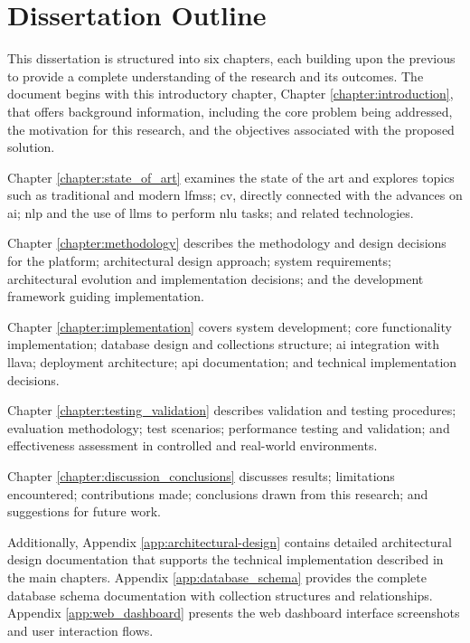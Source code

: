 \section{Dissertation Outline} \label{section:dissertation_outline}

This dissertation is structured into six chapters, each building upon the previous to provide a complete understanding of the research and its outcomes. The document begins with this introductory chapter, Chapter \ref{chapter:introduction}, that offers background information, including the core problem being addressed, the motivation for this research, and the objectives associated with the proposed solution.

Chapter \ref{chapter:state_of_art} examines the state of the art and explores topics such as traditional and modern \acp{lfms}; \ac{cv}, directly connected with the advances on \ac{ai}; \ac{nlp} and the use of \acp{llm} to perform \ac{nlu} tasks; and related technologies.

Chapter \ref{chapter:methodology} describes the methodology and design decisions for the platform; architectural design approach; system requirements; architectural evolution and implementation decisions; and the development framework guiding implementation.

Chapter \ref{chapter:implementation} covers system development; core functionality implementation; database design and collections structure; \ac{ai} integration with \ac{llava}; deployment architecture; \ac{api} documentation; and technical implementation decisions.

Chapter \ref{chapter:testing_validation} describes validation and testing procedures; evaluation methodology; test scenarios; performance testing and validation; and effectiveness assessment in controlled and real-world environments.

Chapter \ref{chapter:discussion_conclusions} discusses results; limitations encountered; contributions made; conclusions drawn from this research; and suggestions for future work.

Additionally, Appendix \ref{app:architectural-design} contains detailed architectural design documentation that supports the technical implementation described in the main chapters. Appendix \ref{app:database_schema} provides the complete database schema documentation with collection structures and relationships. Appendix \ref{app:web_dashboard} presents the web dashboard interface screenshots and user interaction flows.
